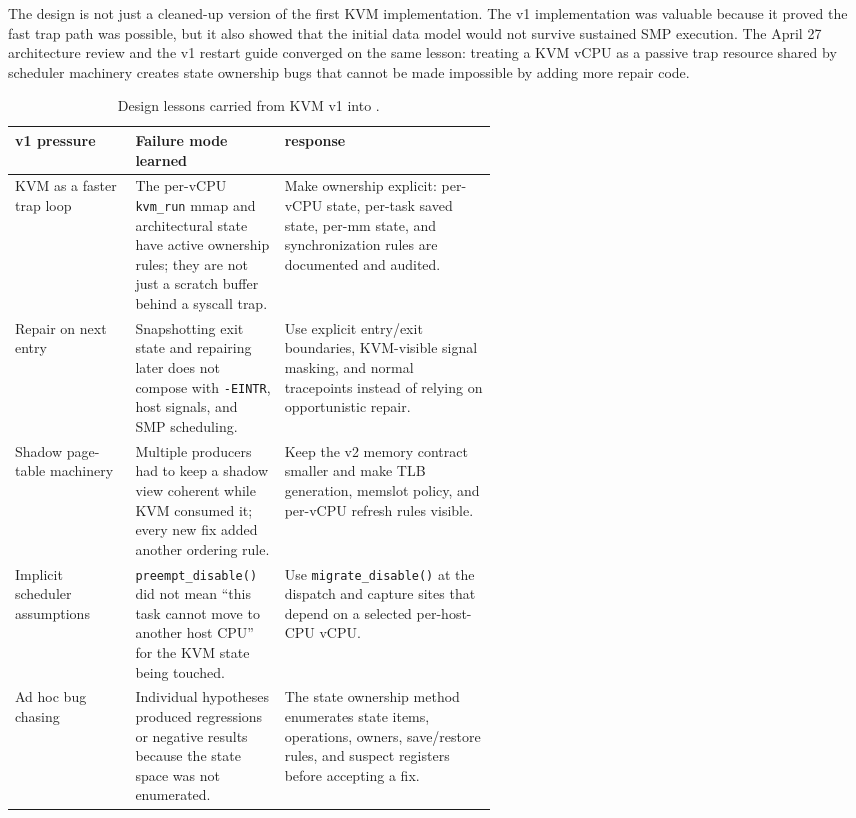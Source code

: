 The \KVMvTwo{} design is not just a cleaned-up version of the first
KVM implementation. The v1 implementation was valuable because it
proved the fast trap path was possible, but it also showed that the
initial data model would not survive sustained SMP execution. The
April 27 architecture review and the v1 restart guide
converged on the same lesson: treating a KVM vCPU as a passive trap
resource shared by \UML{} scheduler machinery creates state ownership
bugs that cannot be made impossible by adding more repair code.

\begin{table}[h]
\centering
\caption{Design lessons carried from KVM v1 into \KVMvTwo{}.}
\small
\begin{tabularx}{\linewidth}{@{}L{0.25\linewidth}L{0.31\linewidth}Y@{}}
\toprule
v1 pressure & Failure mode learned & \KVMvTwo{} response \\
\midrule
KVM as a faster trap loop & The per-vCPU \texttt{kvm\_run} mmap and
architectural state have active ownership rules; they are not just a
scratch buffer behind a syscall trap. & Make ownership explicit:
per-vCPU state, per-task saved state, per-mm state, and synchronization
rules are documented and audited. \\
Repair on next entry & Snapshotting exit state and repairing later
does not compose with \texttt{-EINTR}, host signals, and SMP
scheduling. & Use explicit entry/exit boundaries, KVM-visible signal
masking, and normal tracepoints instead of relying on opportunistic repair. \\
Shadow page-table machinery & Multiple producers had to keep a shadow
view coherent while KVM consumed it; every new fix added another
ordering rule. & Keep the v2 memory contract smaller and make TLB
generation, memslot policy, and per-vCPU refresh rules visible. \\
Implicit scheduler assumptions & \texttt{preempt\_disable()} did not
mean ``this task cannot move to another host CPU'' for the KVM state
being touched. & Use \texttt{migrate\_disable()} at the dispatch and
capture sites that depend on a selected per-host-CPU vCPU. \\
Ad hoc bug chasing & Individual hypotheses produced regressions or
negative results because the state space was not enumerated. & The
state ownership method enumerates state items, operations, owners,
save/restore rules, and suspect registers before accepting a fix. \\
\bottomrule
\end{tabularx}
\end{table}

